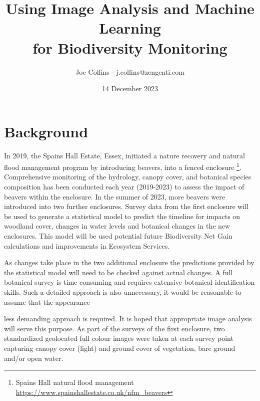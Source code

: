 \documentclass{roles}
\title{Using Image Analysis and Machine Learning\\for Biodiversity Monitoring}
\author{Joe Collins - j.collins@zengenti.com}
\date{14 December 2023}
\begin{document}
\maketitle

\section*{Background}

In 2019, the Spains Hall Estate, Essex,
initiated a nature recovery and natural flood management program by introducing beavers,
into a fenced enclosure
\footnote{Spains Hall natural flood management \href{https://www.spainshallestate.co.uk/nfm\_beavers}{https://www.spainshallestate.co.uk/nfm\_beavers}}.
Comprehensive monitoring of the hydrology, canopy cover, and botanical species composition
has been conducted each year (2019-2023)
to assess the impact of beavers within the enclosure.
In the summer of 2023, more beavers were introduced into two further enclosures.
Survey data from the first enclosure will be used to generate a statistical model
to predict the timeline for impacts on woodland cover, changes in water levels
and botanical changes in the new enclosures.
This model will be used potential future
Biodiversity Net Gain calculations and improvements in Ecosystem Services. 



As changes take place in the two additional enclosure
the predictions provided by the statistical model will need to be checked against actual changes.
A full botanical survey is time consuming and requires extensive botanical identification skills.
Such a detailed approach is also unnecessary,
it would be reasonable to assume that the appearance





less demanding approach is required.
It is hoped that appropriate image analysis will serve this purpose.
As part of the surveys of the first enclosure,
two standardized geolocated full colour images were taken at each survey point
capturing canopy cover (light) and ground cover of vegetation,
bare ground and/or open water.
\end{document}

